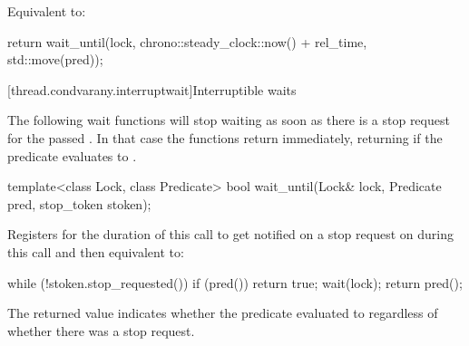 \begin{itemdescr}
\pnum
\effects Equivalent to:
\begin{codeblock}
return wait_until(lock, chrono::steady_clock::now() + rel_time, std::move(pred));
\end{codeblock}
\end{itemdescr}



\clearpage


{\color{insertcolor}
[thread.condvarany.interruptwait]{Interruptible waits}

\pnum
The following wait functions will stop waiting
as soon as there is a stop request for the passed .
In that case the functions return immediately,
returning  if the predicate evaluates to . 




\begin{itemdecl}
template<class Lock, class Predicate>
  bool wait_until(Lock& lock,
                  Predicate pred,
                  stop_token stoken);
\end{itemdecl}

\begin{itemdescr}

 \pnum\effects Registers for the duration of this call  to get notified on a stop request on 
               during this call and then equivalent to:
\begin{codeblock}
while (!stoken.stop_requested()) {
  if (pred())
    return true;
  wait(lock);
}
return pred();
\end{codeblock}

 \pnum \begin{note} The returned value indicates whether the predicate evaluated to
         regardless of whether there was a stop request. \end{note}


\end{itemdescr}}
